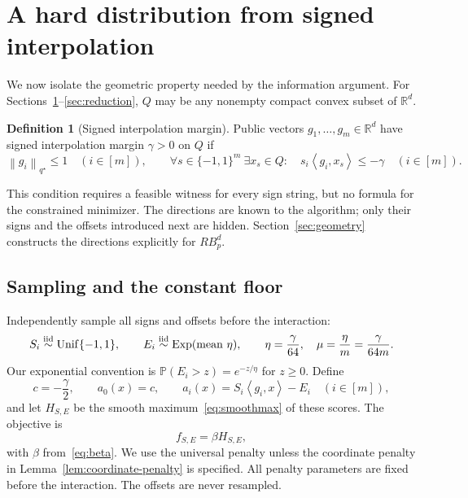 \documentclass[11pt,a4paper]{article}
\theoremstyle{definition}
\newtheorem{definition}[theorem]{Definition}
\theoremstyle{remark}
\newcommand{\R}{\mathbb R}
\newcommand{\Prb}{\mathbb P}
\newcommand{\norm}[1]{\left\lVert #1\right\rVert}
\newcommand{\ip}[2]{\left\langle #1,#2\right\rangle}
\DeclareMathOperator{\Exp}{Exp}
\begin{document}
\section{A hard distribution from signed interpolation}\label{sec:family}

We now isolate the geometric property needed by the information argument.
For Sections~\ref{sec:family}--\ref{sec:reduction}, $Q$ may be any nonempty
compact convex subset of $\R^d$.

\begin{definition}[Signed interpolation margin]\label{def:margin}
Public vectors $g_1,\ldots,g_m\in\R^d$ have signed interpolation margin
$\gamma>0$ on $Q$ if
\begin{equation}\label{eq:margin}
 \norm{g_i}_{q^\star}\le1\quad(i\in[m]),\qquad
 \forall s\in\{-1,1\}^m\ \exists x_s\in Q:\quad
 s_i\ip{g_i}{x_s}\le-\gamma\quad(i\in[m]).
\end{equation}
\end{definition}

This condition requires a feasible witness for every sign string, but no
formula for the constrained minimizer. The directions are known to the
algorithm; only their signs and the offsets introduced next are hidden.
Section~\ref{sec:geometry} constructs the directions explicitly for $RB_p^d$.

\subsection{Sampling and the constant floor}

Independently sample all signs and offsets before the interaction:
\begin{equation}\label{eq:random}
 S_i\stackrel{\rm iid}{\sim}\operatorname{Unif}\{-1,1\},\qquad
 E_i\stackrel{\rm iid}{\sim}\Exp(\text{mean }\eta),\qquad
 \eta=\frac{\gamma}{64},\quad
 \mu=\frac{\eta}{m}=\frac{\gamma}{64m}.
\end{equation}
Our exponential convention is $\Prb(E_i>z)=e^{-z/\eta}$ for $z\ge0$.
Define
\begin{equation}\label{eq:scores}
 c=-\frac\gamma2,\qquad
 a_0(x)=c,\qquad a_i(x)=S_i\ip{g_i}{x}-E_i\quad(i\in[m]),
\end{equation}
and let $H_{S,E}$ be the smooth maximum~\eqref{eq:smoothmax} of these scores.
The objective is
\begin{equation}\label{eq:family}
  f_{S,E}=\beta H_{S,E},
\end{equation}
with $\beta$ from~\eqref{eq:beta}. We use the universal penalty unless the
coordinate penalty in Lemma~\ref{lem:coordinate-penalty} is specified.
All penalty parameters are fixed before the interaction.
The offsets are never resampled.
\end{document}
